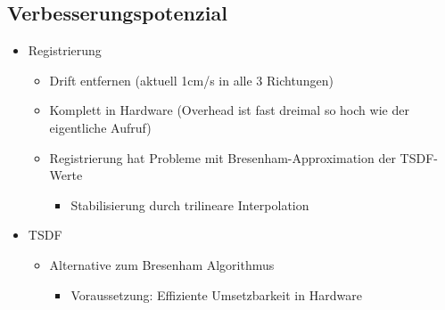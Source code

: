 \documentclass{beamer}
\begin{document}

\subsection{Verbesserungspotenzial}
\begin{frame}{\subsecname}
\begin{itemize}
\item{Registrierung}
\begin{itemize}
\item{Drift entfernen (aktuell 1cm/s in alle 3 Richtungen)}
\item{Komplett in Hardware (Overhead ist fast dreimal so hoch wie der eigentliche Aufruf)}
\item{Registrierung hat Probleme mit Bresenham-Approximation der TSDF-Werte}
\begin{itemize}
\item{Stabilisierung durch trilineare Interpolation}
\end{itemize}
\end{itemize}
\item{TSDF}
\begin{itemize}
\item{Alternative zum Bresenham Algorithmus}
\begin{itemize}
\item{Voraussetzung: Effiziente Umsetzbarkeit in Hardware}
\end{itemize}
\end{itemize}
\end{itemize}
\end{frame}
\end{document}

